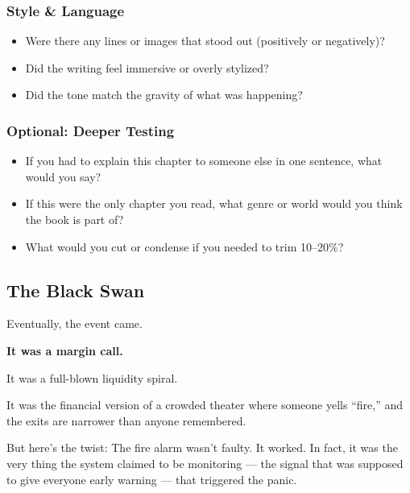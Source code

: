 \subsubsection{Style \& Language}

\begin{itemize}
  \item Were there any lines or images that stood out (positively or negatively)?
  \item Did the writing feel immersive or overly stylized?
  \item Did the tone match the gravity of what was happening?
\end{itemize}

\subsubsection{Optional: Deeper Testing}

\begin{itemize}
  \item If you had to explain this chapter to someone else in one sentence, what would you say?
  \item If this were the only chapter you read, what genre or world would you think the book is part of?
  \item What would you cut or condense if you needed to trim 10–20\%?
\end{itemize}








\subsection{The Black Swan}

Eventually, the event came.

\textbf{It was a margin call.}

It was a full-blown liquidity spiral. 

It was the financial version of a crowded theater where someone yells ``fire,'' and the 
exits are narrower than anyone remembered.

But here’s the twist:
The fire alarm wasn’t faulty. 
It worked.
In fact, it was the very thing the system claimed to be monitoring — the signal that was supposed to give everyone early 
warning — that triggered the panic.

  \medskip

